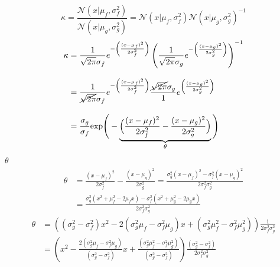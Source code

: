 \documentclass[a4paper,10pt]{book}
\newcommand{\N}{\mathcal{N}}
\theoremstyle{definition}
\newif\ifen
\newif\ifes
\newcommand{\en}[1]{\ifen#1\fi}
\newcommand{\es}[1]{\ifes#1\fi}
\begin{document}
\begin{equation}
\kappa = \frac{\N(x|\mu_f,\sigma_f^2)}{\N(x|\mu_g,\sigma_g^2)} = \N(x|\mu_f,\sigma_f^2)\N(x|\mu_g,\sigma_g^2)^{-1}
\end{equation}
%
\en{By definition}
\begin{equation}
\begin{split}
\kappa & = \frac{1}{\sqrt{2\pi}\sigma_f}e^{-\left(\frac{(x-\mu_f)^2}{2\sigma_f^2}\right)} \left( \frac{1}{\sqrt{2\pi}\sigma_g}e^{-\left(\frac{(x-\mu_g)^2}{2\sigma_g^2}\right)} \right)^{-1} \\[0.3cm]
& = \frac{1}{\cancel{\sqrt{2\pi}}\sigma_f}e^{-\left(\frac{(x-\mu_f)^2}{2\sigma_f^2}\right)} \frac{\cancel{\sqrt{2\pi}}\sigma_g}{1} e^{\left(\frac{(x-\mu_g)^2}{2\sigma_g^2}\right)} \\[0.3cm]
& = \frac{\sigma_g}{\sigma_f}\text{exp}\Bigg(-\underbrace{\Big(\frac{(x-\mu_f)^2}{2\sigma_f^2} - \frac{(x-\mu_g)^2}{2\sigma_g^2}\Big)}_{\theta}\Bigg)
\end{split}
\end{equation}
%
\en{Reorganizing} $\theta$
\begin{equation}
\begin{split}
 \theta & = \frac{(x-\mu_f)^2}{2\sigma_f^2} - \frac{(x-\mu_g)^2}{2\sigma_g^2} = \frac{\sigma_g^2(x-\mu_f)^2 - \sigma_f^2(x-\mu_g)^2}{2\sigma_f^2\sigma_g^2} \\[0.3cm]
 & = \frac{\sigma_g^2(x^2+\mu_f^2-2\mu_fx) - \sigma_f^2(x^2+\mu_g^2-2\mu_gx)}{2\sigma_f^2\sigma_g^2}
\end{split}
\end{equation}
%
\en{We expand and sort terms based on $x$,}
%
\begin{equation}
\begin{split}
 \theta & = \left((\sigma_g^2 - \sigma_f^2)x^2 - 2(\sigma_g^2\mu_f - \sigma_f^2\mu_g)x + (\sigma_g^2\mu_f^2 - \sigma_f^2\mu_g^2 )\right) \frac{1}{2\sigma_f^2\sigma_g^2} \\[0.3cm]
 & = \left(x^2 - \frac{2(\sigma_g^2\mu_f - \sigma_f^2\mu_g)}{(\sigma_g^2 - \sigma_f^2)}x + \frac{(\sigma_g^2\mu_f^2 - \sigma_f^2\mu_g^2 )}{(\sigma_g^2 - \sigma_f^2)}\right) \frac{(\sigma_g^2 - \sigma_f^2)}{2\sigma_f^2\sigma_g^2}
\end{split}
\end{equation}
%
\en{This is quadratic in $x$. Since a term $\varepsilon=0$ independent of $x$ can be added to complete the square in $\theta$, this test is sufficient to determine the mean and variance when it is not necessary to normalize. }%
\end{document}
